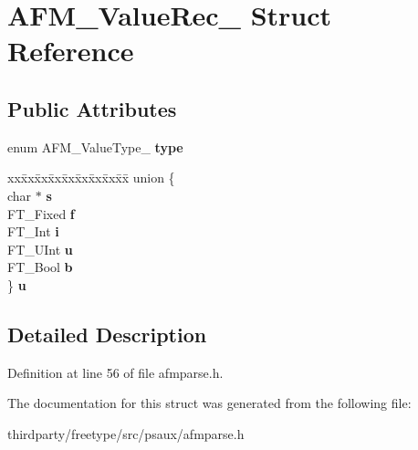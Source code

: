 \hypertarget{struct_a_f_m___value_rec__}{}\section{A\+F\+M\+\_\+\+Value\+Rec\+\_\+ Struct Reference}
\label{struct_a_f_m___value_rec__}
\subsection*{Public Attributes}
\begin{DoxyCompactItemize}
\item 
\mbox{\label{struct_a_f_m___value_rec___a874f0499053b86ebdf2a5e527fe51438}} 
enum A\+F\+M\+\_\+\+Value\+Type\+\_\+ {\bfseries type}
\item 
\mbox{\label{struct_a_f_m___value_rec___a38b12deabe6a110d57fbeeb3df864898}} 
\begin{tabbing}
xx\=xx\=xx\=xx\=xx\=xx\=xx\=xx\=xx\=\kill
union \{\\
\>char $\ast$ {\bfseries s}\\
\>FT\_Fixed {\bfseries f}\\
\>FT\_Int {\bfseries i}\\
\>FT\_UInt {\bfseries u}\\
\>FT\_Bool {\bfseries b}\\
\} {\bfseries u}\\

\end{tabbing}\end{DoxyCompactItemize}


\subsection{Detailed Description}


Definition at line 56 of file afmparse.\+h.



The documentation for this struct was generated from the following file\+:\begin{DoxyCompactItemize}
\item 
thirdparty/freetype/src/psaux/afmparse.\+h\end{DoxyCompactItemize}
